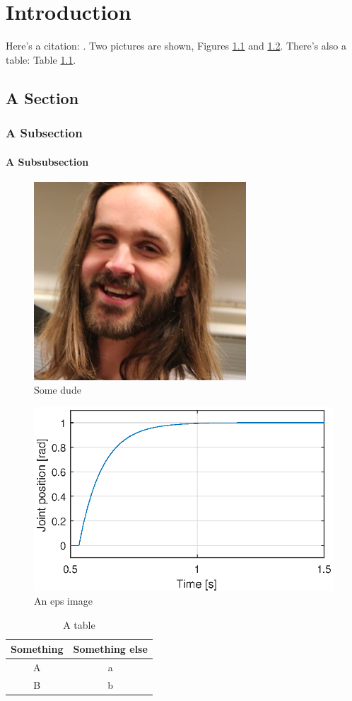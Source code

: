 \chapter{Introduction}\label{cha:introduction}
%
Here's a citation: \cite{Wacker2016}. Two pictures are shown, Figures \ref{fig:morten} and \ref{fig:eps}. There's also a table: Table \ref{tab:a-table}.

\section{A Section}\label{sec:a-section}

\subsection{A Subsection}\label{ssec:a-subsection}

\subsubsection{A Subsubsection}\label{sssec:a-subsubsection}

\lipsum[2]

\begin{figure}[htbp]
  \centering
  \includegraphics[width=.3\textwidth]{img/morten}
  \caption{Some dude}
  \label{fig:morten}
\end{figure}

\begin{figure}[htbp]
  \centering
  \includegraphics[width=.7\textwidth]{img/time-constant}
  \caption{An eps image}
  \label{fig:eps}
\end{figure}

\begin{table}[htbp]
  \centering
  \caption{A table}
  \begin{tabular}{cc}
    \toprule
    Something & Something else \\
    \midrule
    A & a \\
    B & b \\
    \bottomrule
  \end{tabular}
  \label{tab:a-table}
\end{table}
